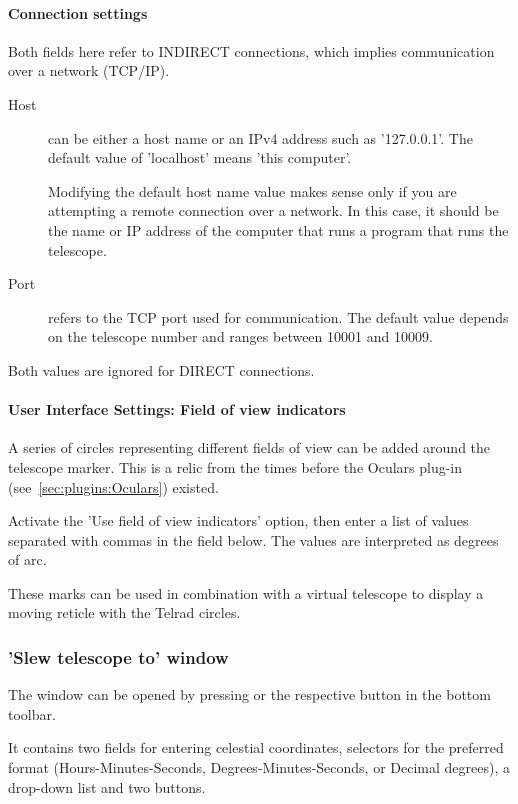 \paragraph{Connection settings}
Both fields here refer to INDIRECT connections, which implies communication over a network (TCP/IP). 
\begin{description}
\item[Host] can be either a host name or an IPv4 address such as
  '127.0.0.1'.  The default value of 'localhost' means 'this
  computer'. 

  Modifying the default host name value makes sense only if you are
  attempting a remote connection over a network. In this case, it
  should be the name or IP address of the computer that runs a program
  that runs the telescope.
\item[Port] refers to the TCP port used for communication. The default
  value depends on the telescope number and ranges between 10001 and
  10009.
\end{description}
%
Both values are ignored for DIRECT connections.

\paragraph{User Interface Settings: Field of view indicators}

A series of circles representing different fields of view can be added
around the telescope marker. This is a relic from the times before the
Oculars plug-in (see~\ref{sec:plugins:Oculars}) existed.

Activate the 'Use field of view indicators' option, then enter
a list of values separated with commas in the field below. The values
are interpreted as degrees of arc.

These marks can be used in combination with a virtual telescope to
display a moving reticle with the Telrad circles.


\subsubsection{'Slew telescope to' window}

The  window can be opened by pressing  or the respective button in the bottom toolbar.

It contains two fields for entering celestial coordinates, selectors
for the preferred format (Hours-Minutes-Seconds,
Degrees-Minutes-Seconds, or Decimal degrees), a drop-down list and two
buttons.


